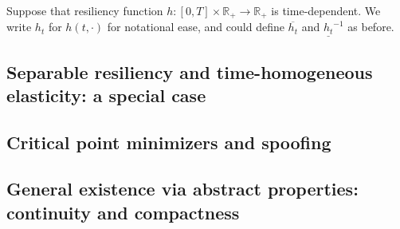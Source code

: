 \documentclass[openany,oneside]{article}
\theoremstyle{definition}
\theoremstyle{remark}
\begin{document}
Suppose that resiliency function $h:[0,T]\times \mathbb{R}_+ \to \mathbb{R}_+$ is time-dependent. We write $h_t$ for $h(t,\cdot)$ for notational ease, and could define $\overline{h_t}$ and $\underline{h_t}^{-1}$ as before.


\subsection{Separable resiliency and time-homogeneous elasticity: a special case}


\subsection{Critical point minimizers and spoofing}


\subsection{General existence via abstract properties: continuity and compactness}



{}

\end{document}
